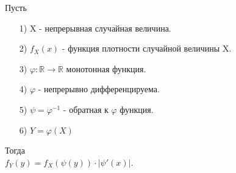 

Пусть
\begin{enumerate}
	\item[1)] X - непрерывная случайная величина.
	\item[2)] $f_X(x)$ - функция плотности случайной величины X.
	\item[3)] $\varphi: \mathbb{R} \to \mathbb{R}$ монотонная функция.
	\item[4)] $\varphi$ - непрерывно дифференцируема.
	\item[5)] $\psi = \varphi^{-1}$ - обратная к $\varphi$ функция.
	\item[6)] $Y = \varphi(X)$
\end{enumerate}
Тогда\\
$f_Y(y) = f_X \left( \psi(y) \right) \cdot |\psi'(x)|$.\\


